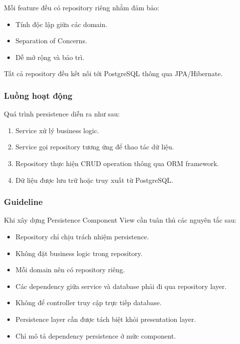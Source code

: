 Mỗi feature đều có repository riêng nhằm đảm bảo:
\begin{itemize}
    \item Tính độc lập giữa các domain.
    \item Separation of Concerns.
    \item Dễ mở rộng và bảo trì.
\end{itemize}

Tất cả repository đều kết nối tới PostgreSQL thông qua JPA/Hibernate.

\subsubsection*{Luồng hoạt động}

Quá trình persistence diễn ra như sau:

\begin{enumerate}
    \item Service xử lý business logic.
    
    \item Service gọi repository tương ứng để thao tác dữ liệu.
    
    \item Repository thực hiện CRUD operation thông qua ORM framework.
    
    \item Dữ liệu được lưu trữ hoặc truy xuất từ PostgreSQL.
\end{enumerate}

\subsubsection*{Guideline}

Khi xây dựng Persistence Component View cần tuân thủ các nguyên tắc sau:

\begin{itemize}
    \item Repository chỉ chịu trách nhiệm persistence.
    
    \item Không đặt business logic trong repository.
    
    \item Mỗi domain nên có repository riêng.
    
    \item Các dependency giữa service và database phải đi qua repository layer.
    
    \item Không để controller truy cập trực tiếp database.
    
    \item Persistence layer cần được tách biệt khỏi presentation layer.
    
    \item Chỉ mô tả dependency persistence ở mức component.
\end{itemize}

